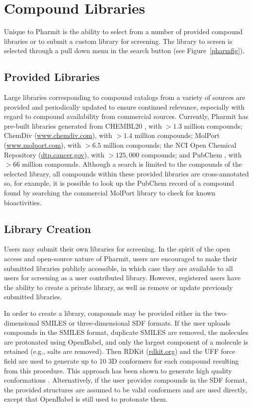 \section{Compound Libraries}

Unique to Pharmit is the ability to select from a number of provided compound libraries or to submit a custom library for screening.  The library to screen is selected through a pull down menu in the search button (see Figure~\ref{pharmfig}).  

\subsection{Provided Libraries}

Large libraries corresponding to compound catalogs from a variety of sources are provided and periodically updated to ensure continued relevance, especially with regard to compound availability from commercial sources.  Currently, Pharmit has pre-built libraries generated from CHEMBL20 \cite{Gaulton_2011}, with $>1.3$ million compounds; ChemDiv (\url{www.chemdiv.com}), with $>1.4$ million compounds; MolPort (\url{www.molport.com}), with $>6.5$ million compounds; the NCI Open Chemical Repository (\url{dtp.cancer.gov}), with $>125,000$ compounds; and PubChem \cite{Kim_2015}, with $>66$ million compounds. 
 Although a search is limited to the compounds of the selected library, all compounds within these provided libraries are cross-annotated so, for example, it is possible to look up the PubChem record of a compound found by searching the commercial MolPort library to check for known bioactivities.


\subsection{Library Creation}

Users may submit their own libraries for screening.  In the spirit of the open access and open-source nature of Pharmit, users are encouraged to make their submitted libraries publicly accessible, in which case they are available to all users for screening as a user contributed library.  However, registered users have the ability to create a private library, as well as remove or update previously submitted libraries. 

In order to create a library, compounds may be provided either in the two-dimensional SMILES or three-dimensional SDF formats.  If the user uploads compounds in the SMILES format, duplicate SMILES are removed, the molecules are protonated using OpenBabel, and only the largest component of a molecule is retained (e.g., salts are removed).  Then RDKit (\url{rdkit.org}) and the UFF force field \cite{Rappe_1992} are used to generate up to 10 3D conformers for each compound resulting from this procedure.  This approach has been shown to generate high quality conformations \cite{Ebejer_2012}.  Alternatively, if the user provides compounds in the SDF format, the provided structures are assumed to be valid conformers and are used directly, except that OpenBabel is still used to protonate them.
